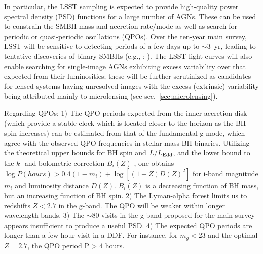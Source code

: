 In particular, the LSST sampling is expected to provide high-quality power
spectral density (PSD) functions for a large number of AGNs. These can be
used to constrain the SMBH mass and accretion rate/mode as well as search
for periodic or quasi-periodic oscillations (QPOs). Over the ten-year main
survey, LSST will be sensitive to detecting periods of a few days up to
$\sim3$~yr, leading to tentative discoveries of binary SMBHs
(e.g., \citet{GrahamEtal2015}; \citet{LiuEtal2015}).
%
%
The LSST light curves will also enable searching for single-image AGNs
exhibiting excess variability over that expected from their luminosities;
these will be further scrutinized as candidates for lensed systems having
unresolved images with the excess (extrinsic) variability being attributed
mainly to microlensing (see sec.~\ref{sec:microlensing}).



Regarding QPOs:
1) The QPO periods expected from the inner accretion disk (which provide
 a stable clock which is located closer to the horizon as the BH spin
  increases) can be estimated from that of the fundamental g-mode, which agree
   with the observed QPO frequencies in stellar mass BH binaries. Utilizing the
    theoretical upper bounds for BH spin and $L/L_{\rm Edd}$, and the lower bound
     to the $k$- and bolometric correction $B_i(Z)$ , one obtains
 $\log P(hours) > 0.4(1-m_i) + \log[(1+Z)D(Z)^2]$
for i-band magnitude $m_i$ and luminosity distance $D(Z)$. $B_i(Z)$ is a decreasing 
function of BH mass, but an increasing function of BH spin.
2) The Lyman-alpha forest limits us to redshifts $Z < 2.7$ in the g-band. The QPO 
will be weaker within longer wavelength bands.
3) The $\sim 80$ visits in the g-band proposed for the main survey appears 
insufficient to produce a useful PSD.
4) The expected QPO periods are longer than a few hour visit in a DDF. For instance,
 for $m_g  <  23$ and the optimal $Z =  2.7$, the QPO period P > 4 hours.

